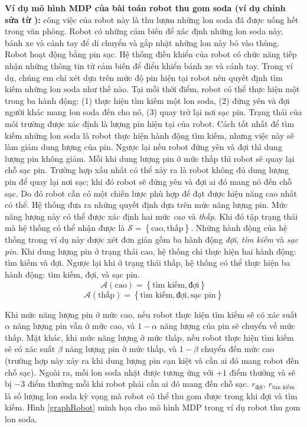 \textbf{Ví dụ mô hình MDP của bài toán robot thu gom soda (ví dụ chỉnh sửa từ \cite{sutton1998introduction}):} công việc của robot này là thu lượm những lon soda đã được uống hết trong văn phòng. 
Robot có những cảm biến để xác định những lon soda này, bánh xe và cánh tay để di chuyển và gắp nhặt những lon này bỏ vào thùng. 
Robot hoạt động bằng pin sạc. 
Hệ thống điều khiển của robot có chức năng tiếp nhận những thông tin từ cảm biến để điểu khiển bánh xe và cánh tay. 
Trong ví dụ, chúng em chỉ xét dựa trên mức độ pin hiện tại robot nên quyết định tìm kiếm những lon soda như thế nào.
Tại mỗi thời điểm, robot có thể thực hiện một trong ba hành động: (1) thực hiện tìm kiếm một lon soda, (2) đứng yên và đợi người khác mang lon soda đến cho nó, (3) quay trở lại nơi sạc pin. 
Trạng thái của môi trường được xác định là lượng pin hiện tại của robot. 
Cách tốt nhất để tìm kiếm những lon soda là robot thực hiện hành động tìm kiếm, nhưng việc này sẽ làm giảm dung lượng của pin. 
Ngược lại nếu robot đứng yên và đợi thì dung lượng pin không giảm. 
Mỗi khi dung lượng pin ở mức thấp thì robot sẽ quay lại chỗ sạc pin. 
Trường hợp xấu nhất có thể xảy ra là robot không đủ dung lượng pin để quay lại nơi sạc; khi đó robot sẽ đứng yên và đợi ai đó mang nó đến chỗ sạc. 
Do đó robot cần có một chiến lược phù hợp để đạt được hiệu năng cao nhất có thể.
Hệ thống đưa ra những quyết định dựa trên mức năng lượng pin. 
Mức năng lượng này có thể được xác định hai mức \textit{cao} và \textit{thấp}. 
Khi đó tập trạng thái mà hệ thống có thể nhận được là $\mathcal{S} = \left \{\text{cao}, \text{thấp} \right \}$. 
Những hành động của hệ thống trong ví dụ này được xét đơn giản gồm ba hành động \textit{đợi}, \textit{tìm kiếm} và \textit{sạc pin}. Khi dung lượng pin ở trạng thái cao, hệ thống chỉ thực hiện hai hành động: tìm kiếm và đợi. 
Ngược lại khi ở trạng thái thấp, hệ thống có thể thực hiện ba hành động: tìm kiếm, đợi, và sạc pin.
$$\mathcal{A}(\text{cao}) =  \left \{\text{tìm kiếm}, \text{đợi} \right \}$$
$$\mathcal{A}(\text{thấp}) =  \left \{\text{tìm kiếm}, \text{đợi}, \text{sạc pin} \right \}$$

Khi mức năng lượng pin ở mức cao, nếu robot thực hiện tìm kiếm sẽ có xác suất $\alpha$ năng lượng pin vẫn ở mức cao, và $1 - \alpha$ năng lượng của pin sẽ chuyển về mức thấp. 
Mặt khác, khi mức năng lượng ở mức thấp, nếu robot thực hiện tìm kiếm sẽ có xác suất $\beta$ năng lượng pin ở mức thấp, và $1 - \beta$ chuyển đến mức cao (trường hợp này xảy ra khi dung lượng pin cạn kiệt và cần ai đó mang robot đến chỗ sạc). 
Ngoài ra, mỗi lon soda nhặt được tương ứng với $+1$ điểm thưởng và sẽ bị $-3$ điểm thưởng mỗi khi robot phải cần ai đó mang đến chỗ sạc. $r_{\text{đợi}}$, $r_{\text{tìm kiếm}}$ là số lượng lon soda kỳ vọng mà robot có thể thu gom được trong khi đợi và tìm kiếm. Hình \ref{graphRobot} minh họa cho mô hình MDP trong ví dụ robot thu gom lon soda.

